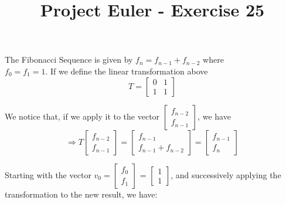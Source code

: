 \documentclass{article}
\title{Project Euler - Exercise 25}
\date{}
\begin{document}
\maketitle
The Fibonacci Sequence is given by $f_n = f_{n - 1} + f_{n - 2}$
where\\ $f_0= f_1 = 1$.
If we define the linear transformation above
\begin{equation*}
    T =
    \begin{bmatrix}
        0 & 1\\
        1 & 1
    \end{bmatrix}
\end{equation*}

We notice that, if we apply it to the vector $\begin{bmatrix}
    f_{n - 2} \\
        f_{n - 1}
\end{bmatrix}$, we have
\begin{equation*}
    \Rightarrow
    T \begin{bmatrix}
        f_{n - 2} \\
        f_{n - 1}
    \end{bmatrix} =
    \begin{bmatrix}
        f_{n - 1} \\
        f_{n - 1} + f_{n - 2}
    \end{bmatrix} =
    \begin{bmatrix}
        f_{n - 1} \\
        f_{n}
    \end{bmatrix}
\end{equation*}

Starting with the vector $v_0 = \begin{bmatrix}
    f_{0} \\
        f_{1}
\end{bmatrix}$ = $\begin{bmatrix}
    1 \\
    1
\end{bmatrix}$, and successively applying the transformation to the new result,
we have:
\end{document}
